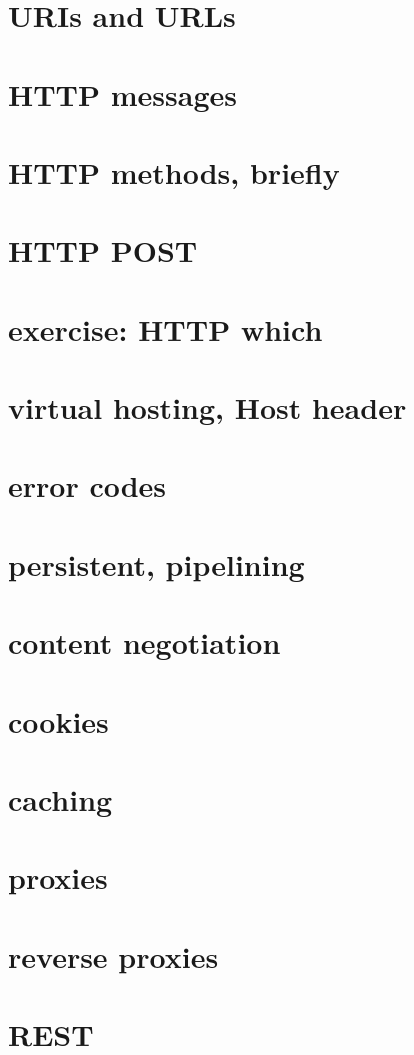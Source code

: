 \section{URIs and URLs}


\section{HTTP messages}


\section{HTTP methods, briefly}


\section{HTTP POST}


\section{exercise: HTTP which}


\section{virtual hosting, Host header}


\section{error codes}


\section{persistent, pipelining}


\section{content negotiation}


\section{cookies}


\section{caching}


\section{proxies}

\section{reverse proxies}

\section{REST}

